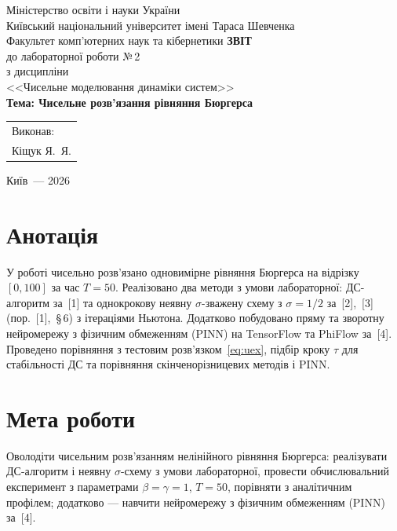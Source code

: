 \documentclass[14pt,a4paper,extarticle]{extarticle}
\begin{document}
\begin{titlepage}
  \centering\thispagestyle{empty}
  Міністерство освіти і науки України\\[0.4em]
  Київський національний університет імені Тараса Шевченка\\[0.4em]
  Факультет комп'ютерних наук та кібернетики
  \vfill
  {\Large\bfseries ЗВІТ}\\[0.6em]
  до лабораторної роботи №\,2\\[0.4em]
  з дисципліни\\[0.2em]
  <<Чисельне моделювання динаміки систем>>\\[1.2em]
  {\large\bfseries Тема: Чисельне розв'язання рівняння Бюргерса}
  \vfill
  \begin{flushright}
    \begin{tabular}{@{}l@{}}
      Виконав:\\
      Кіщук Я.~Я.\\[1.2em]
    \end{tabular}
  \end{flushright}
  \vfill
  Київ~--- 2026
\end{titlepage}

\section*{Анотація}

У роботі чисельно розв'язано одновимірне рівняння Бюргерса на відрізку $[0,100]$ за час $T=50$.
Реалізовано два методи з умови лабораторної: ДС-алгоритм за~[1] та однокрокову неявну $\sigma$-зважену схему з $\sigma=1/2$ за~[2],~[3] (пор.~[1],~\S\,6) з ітераціями Ньютона.
Додатково побудовано пряму та зворотну нейромережу з фізичним обмеженням (PINN) на TensorFlow та PhiFlow за~[4].
Проведено порівняння з тестовим розв'язком~\eqref{eq:uex}, підбір кроку $\tau$ для стабільності ДС та порівняння скінченорізницевих методів і PINN.

\tableofcontents
\newpage

\section{Мета роботи}

Оволодіти чисельним розв'язанням нелінійного рівняння Бюргерса: реалізувати ДС-алгоритм і неявну $\sigma$-схему з умови лабораторної, провести обчислювальний експеримент з параметрами $\beta=\gamma=1$, $T=50$, порівняти з аналітичним профілем; додатково --- навчити нейромережу з фізичним обмеженням (PINN) за~[4].
\end{document}
